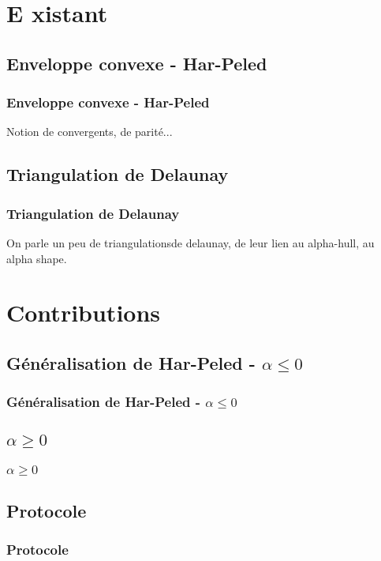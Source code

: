\documentclass{beamer}
\begin{document}
\section{E  xistant} 

\subsection{Enveloppe convexe - Har-Peled} 
\begin{frame}
\frametitle{Enveloppe convexe - Har-Peled}
Notion de convergents, de parité...
\end{frame}

\subsection{Triangulation de Delaunay}  %
\begin{frame}
\frametitle{Triangulation de Delaunay}
On parle un peu de triangulationsde delaunay, de leur lien au alpha-hull, au alpha shape.
\end{frame}

\section{Contributions} 

\subsection{Généralisation de Har-Peled - $\alpha \leq 0$} 
\begin{frame}
\frametitle{Généralisation de Har-Peled - $\alpha \leq 0$}

\end{frame}

\subsection{$\alpha \geq 0$} 
\begin{frame}
\frametitle{$\alpha \geq 0$}
\end{frame}

\subsection{Protocole} 
\begin{frame}
\frametitle{Protocole}
\end{frame}
\end{document}
